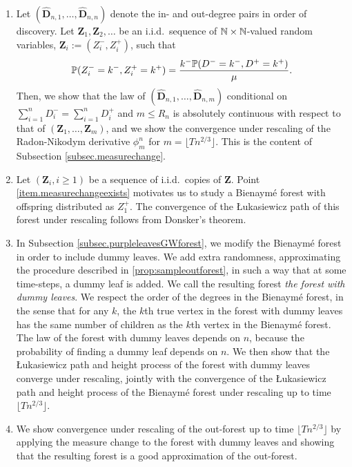 \begin{enumerate}
    \item \label{item.measurechangeexists} Let $(\mathbf{\hat{D}}_{n,1},\dots,\mathbf{\hat{D}}_{n,n})$ denote the in- and out-degree pairs in order of discovery. Let $\mathbf{Z}_1, \mathbf{Z}_2, \ldots$ be an i.i.d.\ sequence of $\N\times \N$-valued random variables, $\mathbf{Z}_i:=(Z_i^-,Z_i^+)$, such that 
    $$\P(Z_i^-=k^-, Z_i^+=k^+)=\frac{k^-\P(D^-=k^-,D^+=k^+)}{\mu}.$$
    Then, we show that the law of $(\mathbf{\hat{D}}_{n,1},\dots,\mathbf{\hat{D}}_{n,m})$ conditional on $\sum_{i=1}^n D_i^-=\sum_{i=1}^n D_i^+$ and $m \leq R_n$ is absolutely continuous with respect to that of $(\mathbf{Z}_1,\dots, \mathbf{Z}_m)$, and we show the convergence under rescaling of the Radon-Nikodym derivative $\phi_m^n$ for $m=\lfloor T n^{2/3}\rfloor$. This is the content of Subsection \ref{subsec.measurechange}.
    \item Let $(\mathbf{Z}_i,i\geq 1)$ be a sequence of i.i.d.\ copies of $\mathbf{Z}$. Point \ref{item.measurechangeexists} motivates us to study a Bienaymé forest with offspring distributed as $Z_1^+$. The convergence of the \L ukasiewicz path of this forest under rescaling follows from Donsker's theorem.
    \item In Subsection \ref{subsec.purpleleavesGWforest}, we modify the Bienaymé forest in order to include dummy leaves. We add extra randomness, approximating the procedure described in \cref{prop:sampleoutforest}, in such a way that at some time-steps, a dummy leaf is added. We call the resulting forest \emph{the forest with dummy leaves}. We respect the order of the degrees in the Bienaymé forest, in the sense that for any $k$, the $k$th true vertex in the forest with dummy leaves has the same number of children as the $k$th vertex in the Bienaymé forest. The law of the forest with dummy leaves depends on $n$, because the probability of finding a dummy leaf depends on $n$. We then show that the \L ukasiewicz path and height process of the forest with dummy leaves converge under rescaling, jointly with the convergence of the \L ukasiewicz path and height process of the Bienaymé forest under rescaling up to time $\lfloor T n^{2/3}\rfloor$.
    \item We show convergence under rescaling of the out-forest up to time $\lfloor T n^{2/3}\rfloor$ by applying the measure change to the forest with dummy leaves and showing that the resulting forest is a good approximation of the out-forest. 
\end{enumerate}

